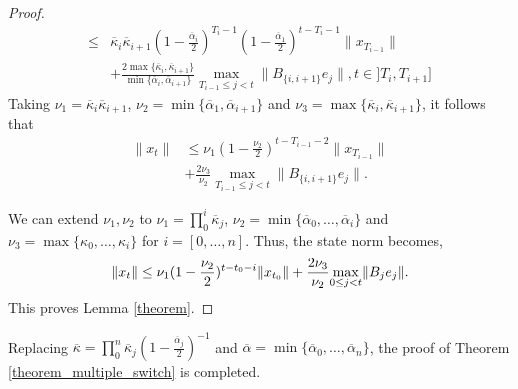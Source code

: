 \documentclass[letterpaper, 10 pt, conference]{ieeeconf}  %
\begin{document}
\begin{proof}
\begin{align*}
    \leq &\overline{\kappa}_i \overline{\kappa}_{i+1} (1-\frac{\overline{\alpha}_i}{2})^{T_i-1}(1-\frac{\overline{\alpha}_1}{2})^{t-T_i-1}\|x_{T_{i-1}}\| \\ &+ \frac{2\max \{\overline{\kappa}_i, \overline{\kappa}_{i+1}\}}{\min \{\bar{\alpha}_i, \bar{\alpha}_{i+1}\}}  \underset{T_{i-1}\leq j < t}{\max} \|B_{\{i,i+1\}}e_j\|, t \in ]T_i, T_{i+1}]
\end{align*}
Taking $\nu_1 = \overline{\kappa}_i \overline{\kappa}_{i+1}$, $\nu_2 = \min \{\overline{\alpha}_1, \overline{\alpha}_{i+1}\}$ and $\nu_3 = \max \{ \overline{\kappa}_i,  \overline{\kappa}_{i+1} \}$, it follows that 
\begin{align*}
    \|x_t\| &\leq \nu_1(1-\frac{\nu_2}{2})^{t-T_{i-1}-2}\|x_{T_{i-1}}\| \\ 
    &+\frac{2\nu_3}{\nu_2} \underset{T_{i-1}\leq j < t}{\max} \|B_{\{i,i+1\}} e_j\|.
\end{align*}

We can extend $\nu_1, \nu_2$ to $\nu_1 = \prod_{0}^{i} \overline{\kappa}_j$, $\nu_2 = \min \{\overline{\alpha}_0, \dots, \overline{\alpha}_{i}\}$ and $\nu_3 = \max \{ \kappa_0, \dots, \kappa_i\}$ for $i = [0, \dots, n]$. Thus, the state norm becomes, 
\begin{equation}
    \|x_t\| \leq \nu_1(1-\frac{\nu_2}{2})^{t-t_0-i}\|x_{t_0}\| \\ +\frac{2\nu_3}{\nu_2} \underset{0\leq j < t}{\max} \|B_j e_j\|.
\end{equation}
This proves Lemma \ref{theorem}.\end{proof}
Replacing $\overline{\kappa} = \prod_{0}^{n} \overline{\kappa}_j(1-\frac{\overline{\alpha}_j}{2})^{-1}$ and $\overline{\alpha} = \min \{\overline{\alpha}_0, \dots, \overline{\alpha}_{n}\}$, the proof of Theorem \ref{theorem_multiple_switch} is completed. 
\end{document}
